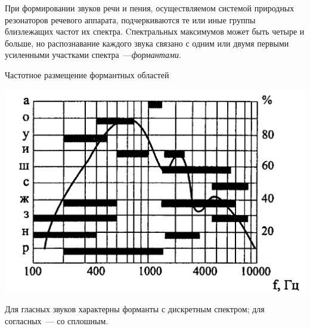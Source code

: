 \documentclass{beamer}
\begin{document}
\begin{frame}
При формировании звуков речи и пения, осуществляемом системой природных резонаторов речевого аппарата, подчеркиваются те или иные группы близлежащих частот их спектра. Cпектральных максимумов может быть четыре и больше, но распознавание каждого звука связано с одним или двумя первыми усиленными участками спектра~---{\itshape формантами}. 
\begin{block}{Частотное размещение формантных областей}
\begin{center}
\includegraphics[scale=0.4]{pic-soundkind-02}
\end{center}
\end{block}
Для гласных звуков характерны форманты с дискретным спектром; для согласных~--- со сплошным.
\end{frame}   
   
\end{document}
